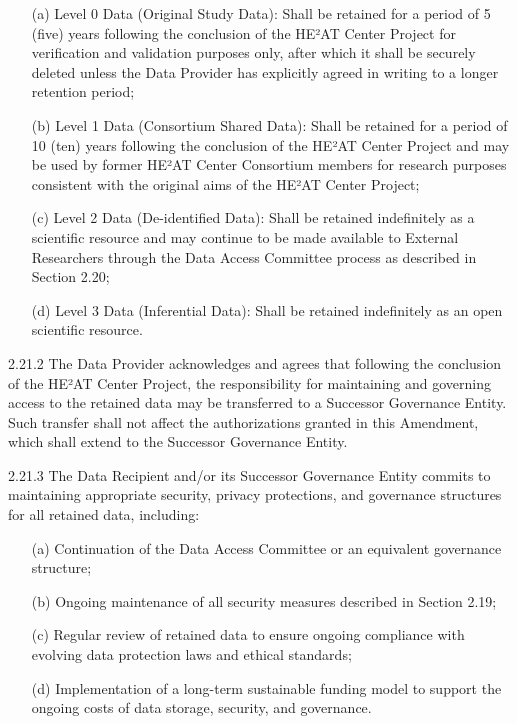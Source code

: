 \documentclass[12pt,letterpaper]{article}
\newcommand{\added}[1]{\textcolor{addcolor}{#1}}
\begin{document}
\added{\begin{enumerate}
\item[(a)] Level 0 Data (Original Study Data): Shall be retained for a period of 5 (five) years following the conclusion of the HE²AT Center Project for verification and validation purposes only, after which it shall be securely deleted unless the Data Provider has explicitly agreed in writing to a longer retention period;
   
\item[(b)] Level 1 Data (Consortium Shared Data): Shall be retained for a period of 10 (ten) years following the conclusion of the HE²AT Center Project and may be used by former HE²AT Center Consortium members for research purposes consistent with the original aims of the HE²AT Center Project;
   
\item[(c)] Level 2 Data (De-identified Data): Shall be retained indefinitely as a scientific resource and may continue to be made available to External Researchers through the Data Access Committee process as described in Section 2.20;
   
\item[(d)] Level 3 Data (Inferential Data): Shall be retained indefinitely as an open scientific resource.
\end{enumerate}}

\added{2.21.2 The Data Provider acknowledges and agrees that following the conclusion of the HE²AT Center Project, the responsibility for maintaining and governing access to the retained data may be transferred to a Successor Governance Entity. Such transfer shall not affect the authorizations granted in this Amendment, which shall extend to the Successor Governance Entity.}

\added{2.21.3 The Data Recipient and/or its Successor Governance Entity commits to maintaining appropriate security, privacy protections, and governance structures for all retained data, including:}

\added{\begin{enumerate}
\item[(a)] Continuation of the Data Access Committee or an equivalent governance structure;
   
\item[(b)] Ongoing maintenance of all security measures described in Section 2.19;
   
\item[(c)] Regular review of retained data to ensure ongoing compliance with evolving data protection laws and ethical standards;
   
\item[(d)] Implementation of a long-term sustainable funding model to support the ongoing costs of data storage, security, and governance.
\end{enumerate}}
\end{document}
